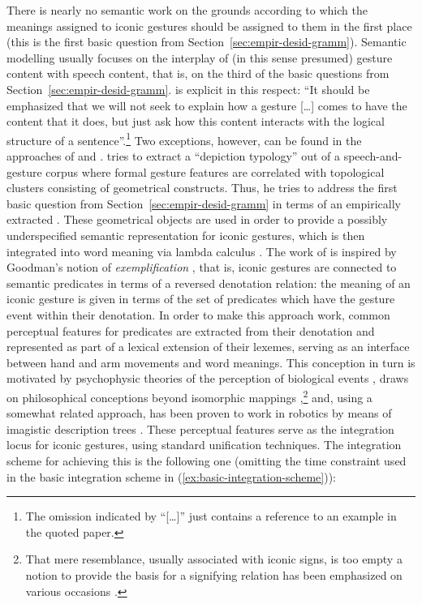 \documentclass[output=paper,biblatex,babelshorthands,newtxmath,draftmode,colorlinks,citecolor=brown]{langscibook}
\begin{document}
There is nearly no semantic work on the grounds according to which the meanings assigned to iconic gestures should be assigned to them in the first place (this is the first basic question from Section~\ref{sec:empir-desid-gramm}).
%
Semantic modelling usually focuses on the interplay of (in this sense presumed) gesture content with speech content, that is, on the third of the basic questions from Section~\ref{sec:empir-desid-gramm}.
%
\citet[]{Schlenker:2018} is explicit in this respect: \enquote{It should be emphasized that we will not seek to explain how a gesture [\ldots] comes to have the content that it does, but just ask how this content interacts with the logical structure of a sentence}.\footnote{The omission indicated by \enquote{[\ldots]} just contains a reference to an example in the quoted paper.}
%
Two exceptions, however, can be found in the approaches of \citet{Rieser:2010} and \citet{Luecking:2013:a,Luecking:2016}.
%
\citet{Rieser:2010} tries to extract a \enquote{depiction typology} out of a speech-and-gesture corpus where formal gesture features are correlated with topological clusters consisting of geometrical constructs. 
%
Thus, he tries to address the first basic question from Section~\ref{sec:empir-desid-gramm} in terms of an empirically extracted .
%
These geometrical objects are used in order to provide a possibly underspecified semantic representation for iconic gestures, which is then integrated into word meaning via lambda calculus \citep{Hahn:Rieser:2010,Rieser:2011}.
%
The work of \citet{Luecking:2013:a,Luecking:2016} is inspired by Goodman's notion of \emph{exemplification} \citep{Goodman:1976}, that is, iconic gestures are connected to semantic predicates in terms of a reversed denotation relation: the meaning of an iconic gesture is given in terms of the set of predicates which have the gesture event within their denotation.
%
In order to make this approach work, common perceptual features for predicates are extracted from their denotation and represented as part of a lexical extension of their lexemes, serving as an interface between hand and arm movements and word meanings. 
%
This conception in turn is motivated by psychophysic theories of the perception of biological events \citep{Johansson:1973}, draws on philosophical  conceptions beyond isomorphic mappings \citep{Peacocke:1987},\footnote{\label{fn:resemblance}That mere resemblance, usually associated with iconic signs, is too empty a notion to provide the basis for a signifying relation has been emphasized on various occasions \citep{Burks:1949,Bierman:1962,Eco:1976,Goodman:1976,Sonesson:1998}.} and, using a somewhat related approach, has been proven to work in robotics by means of imagistic description trees \citep{Sowa:2006:a}.
%
These perceptual features serve as the integration locus for iconic gestures, using standard unification techniques. 
%
The integration scheme for achieving this is the following one \citep[]{Luecking:2013:a} (omitting the time constraint used in the basic integration scheme in (\ref{ex:basic-integration-scheme})):
\end{document}
